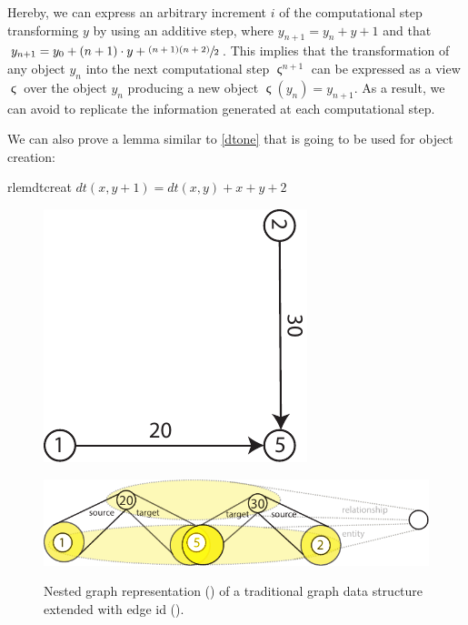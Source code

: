 Hereby, we can express an arbitrary increment $i$ of the computational step transforming $y$ by using an additive step, where $y_{n+1}=y_n+y+1$ and that $y_{n+1}=y_0+(n+1)\cdot y+\sfrac{(n+1)(n+2)}{2}$. This implies that the transformation of any object $y_n$ into the next computational step $\stigma^{n+1}$ can be expressed as a view $\stigma$ over the object $y_n$ producing a new object $\stigma(y_n)=y_{n+1}$. As a result, we can avoid to replicate the information generated at each computational step.

We can also prove a lemma similar to \ref{dtone} that is going to be used for object creation:
\begin{restatable}{rlem}{dtcreat}
	\label{dtcreat}
	$dt(x,y+1)=dt(x,y)+x+y+2$
\end{restatable}




\begin{figure}[!t]
	\centering
	\begin{minipage}{0.3\textwidth}
		\centering
		\includegraphics[scale=0.6]{fig/04model/05graphs}
		\label{subfig:traditionalgraphtoNest}
	\end{minipage}\qquad \begin{minipage}{0.6\textwidth}
		\centering
		\includegraphics[scale=0.8]{fig/04model/05nested}
		\label{subfig:nestedreprofgraph}
	\end{minipage}
	\caption{Nested graph representation () of a traditional graph data structure extended with edge id ().}
	\label{subfig:representableGraphs}
\end{figure}
